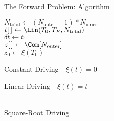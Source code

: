 \documentclass{beamer}
\begin{document}
\begin{frame}{The Forward Problem: Algorithm}
\begin{algorithm}[H]
    \footnotesize


        $ N_{\text{total}} \leftarrow (N_{\text{outer}} - 1)*N_{\text{inner}}$ \\
        $ t[\thinspace] \leftarrow \Lin(T_0,T_F,N_{\text{total}})$ \\
        $ \delta t \leftarrow t_1$ \\

        $ z[\thinspace] \leftarrow \Com[N_{\text{outer}}] $ \\
        $ z_0 \leftarrow \xi(T_0) $ \\

\nl{}
\end{algorithm}
\end{frame}

\begin{frame}{Constant Driving - $\xi(t) = 0$}
\begin{adjustbox}{max totalsize={\textwidth}{\textheight}}

\end{adjustbox}
\end{frame}

\begin{frame}{Linear Driving - $\xi(t) = t$}
    \begin{tabular}{cc}
\begin{adjustbox}{max totalsize={.3\textwidth}{.9\textheight}}

\end{adjustbox}
\begin{adjustbox}{max totalsize={.7\textwidth}{.9\textheight}}

\end{adjustbox}
\end{tabular}
\end{frame}

\begin{frame}{Square-Root Driving}
\begin{adjustbox}{max totalsize={\textwidth}{\textheight}}

\end{adjustbox}
\end{frame}
\end{document}
